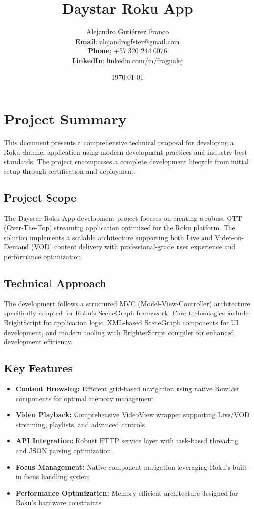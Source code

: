 \documentclass[11pt,letterpaper]{article}
\title{\textbf{\LARGE Daystar Roku App}\\}
\author{Alejandro Gutiérrez Franco\\
        \textbf{Email}: alejandrogfster@gmail.com\\
        \textbf{Phone}: +57 320 244 0076\\
        \textbf{LinkedIn}: \href{https://www.linkedin.com/in/fragualej}{linkedin.com/in/fragualej}}
\date{\today}
\begin{document}
\maketitle
\thispagestyle{empty}

\newpage
\tableofcontents
\newpage

\section{Project Summary}
\label{sec:summary}

This document presents a comprehensive technical proposal for developing a Roku channel application using modern development practices and industry best standards. The project encompasses a complete development lifecycle from initial setup through certification and deployment.

\subsection{Project Scope}
The Daystar Roku App development project focuses on creating a robust OTT (Over-The-Top) streaming application optimized for the Roku platform. The solution implements a scalable architecture supporting both Live and Video-on-Demand (VOD) content delivery with professional-grade user experience and performance optimization.

\subsection{Technical Approach}
The development follows a structured MVC (Model-View-Controller) architecture specifically adapted for Roku's SceneGraph framework. Core technologies include BrightScript for application logic, XML-based SceneGraph components for UI development, and modern tooling with BrighterScript compiler for enhanced development efficiency.

\subsection{Key Features}
\begin{itemize}
    \item \textbf{Content Browsing:} Efficient grid-based navigation using native RowList components for optimal memory management
    \item \textbf{Video Playback:} Comprehensive VideoView wrapper supporting Live/VOD streaming, playlists, and advanced controls
    \item \textbf{API Integration:} Robust HTTP service layer with task-based threading and JSON parsing optimization
    \item \textbf{Focus Management:} Native component navigation leveraging Roku's built-in focus handling system
    \item \textbf{Performance Optimization:} Memory-efficient architecture designed for Roku's hardware constraints
\end{itemize}
\end{document}
